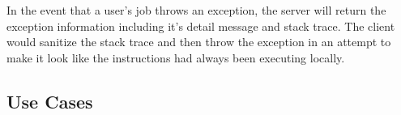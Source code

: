 \documentclass[12pt, oneside,english]{article}
\begin{document}
    In the event that a user's job throws an exception, the server will return
    the exception information including it's detail message and stack trace.
    The client would sanitize the stack trace and then throw the exception
    in an attempt to make it look like the instructions had always been
    executing locally.

    \subsection{Use Cases}\label{subsec:useCases}
\end{document}
